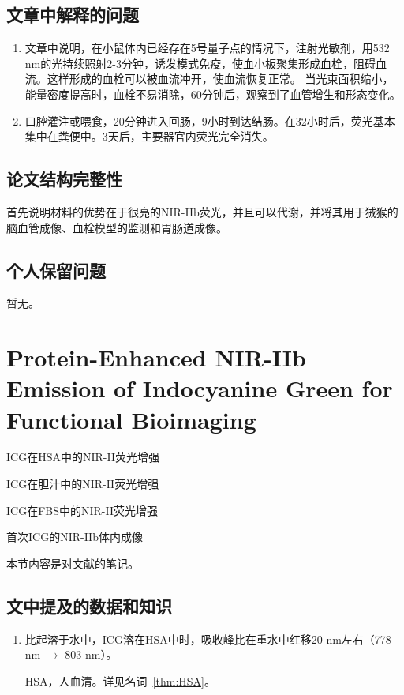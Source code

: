 \documentclass[cn,11pt,chinese]{elegantbook}
\begin{document}
\subsection{文章中解释的问题}
\begin{enumerate}[itemsep=1.5ex]
   \item {}
  文章中说明，在小鼠体内已经存在5号量子点的情况下，注射光敏剂，用532 nm的光持续照射2-3分钟，诱发模式免疫，使血小板聚集形成血栓，阻碍血流。这样形成的血栓可以被血流冲开，使血流恢复正常。
  当光束面积缩小，能量密度提高时，血栓不易消除，60分钟后，观察到了血管增生和形态变化。
   \item {}
口腔灌注或喂食，20分钟进入回肠，9小时到达结肠。在32小时后，荧光基本集中在粪便中。3天后，主要器官内荧光完全消失。
 \end{enumerate} 

\subsection{论文结构完整性}
首先说明材料的优势在于很亮的NIR-IIb荧光，并且可以代谢，并将其用于狨猴的脑血管成像、血栓模型的监测和胃肠道成像。

\subsection{个人保留问题}
暂无。

\section{Protein-Enhanced NIR-IIb Emission of Indocyanine Green for Functional Bioimaging}
\begin{introduction}[创新点概要]
  \item ICG在HSA中的NIR-II荧光增强
  \item ICG在胆汁中的NIR-II荧光增强
  \item ICG在FBS中的NIR-II荧光增强
  \item 首次ICG的NIR-IIb体内成像
\end{introduction}

本节内容是对文献\cite{Hemubin2020}的笔记。

\subsection{文中提及的数据和知识}
\begin{enumerate}
  \item 比起溶于水中，ICG溶在HSA中时，吸收峰比在重水中红移20 nm左右（778 nm $\to$ 803 nm）。
\begin{note}
  HSA，人血清。详见名词~\vref{thm:HSA}。
\end{note}
\end{enumerate}
\end{document}
